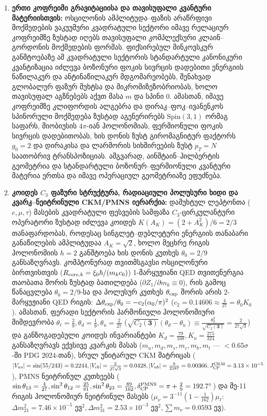 \documentclass[11pt,a4paper]{article}
\begin{document}
\begin{enumerate}[label=\arabic*.]
\item \textbf{ერთი კოფრეიმი გრავიტაციისა და თავისუფალი კვანტური მატერიისთვის:} ოსცილონის ამპლიტუდა–ფაზის არაწრფივი მოქმედების ვაკუუმური კვადრატული სექტორი იმავე რელაციურ კოფრეიმზე ზუსტად იღებს თავისუფალი კომპლექსური კლაინ–გორდონის მოქმედების ფორმას. ფიქსირებულ მინკოვსკურ განშტოებაზე ამ კვადრატული სექტორის სტანდარტული კანონიკური კვანტიზაცია იძლევა ბოზონური ფოკის სივრცის დადებითი ენერგიის ნაწილაკურ და ანტინაწილაკურ მდგომარეობებს, შენახვად გლობალურ ფაზურ მუხტსა და მიკრომიზეზობრიობას, ხოლო თავისუფალ აგზნებებს აქვთ მასა $m$ და სპინი $0$. ამასთან, იმავე კოფრეიმზე კლიფორდის ალგებრა და დირაკ–ფოკ–ივანენკოს სპინორული მოქმედება ზუსტად აგენერირებს $\mathrm{Spin}(3,1)$ ორმაგ საფარს, მიობიუსის $4\pi$-იან ჰოლონომიას, ფერმიონული ფოკის სივრცის დადებითობას, ხის დონის ზუსტ გირომაგნიტურ ფაქტორს $g_0=2$ და დირაკისა და ლარმორის სიხშირეების ზუსტ $p_T = N$ საათობრივ ტრანსპოზიციას. ამგვარად, აინშტაინ–ჰილბერტის გეომეტრია და სტანდარტული ბოზონურ–ფერმიონული კვანტური მატერია ერთსა და იმავე ოპერაციულ გეომეტრიაზე ეფუძნება.
\item \textbf{კოიდეს $C_3$ ფაზური სტრუქტურა, რადიაციული პოლუსური ხიდი და კვარკ–ნეიტრინული CKM/PMNS იერარქია:} დამუხტულ ლეპტონთა ($e,\mu,\tau$) მასების კვადრატული ფესვების სამფაზა $C_3$-ცირკულანტური ოპერატორი ზუსტად იძლევა კოიდეს $K(A_K) = (2+A_K^2)/6 = 2/3$ თანაფარდობას, როდესაც სინგლეტ–დუბლეტური ენერგიის თანაბარი განაწილების ამპლიტუდაა $A_K=\sqrt2$, ხოლო მეცხრე რიგის ჰოლონომიის $h=2$ განშტოება ხის დონის კუთხეს $\theta_0=2/9$ განსაზღვრავს. კომპტონურად თვითმსგავსი ოსცილონური ბირთვისთვის ($R_{{\rm core},k} = \xi_0\hbar/(m_k c_0)$) 1-მარყუჟიანი QED თვითენერგია თაობათა შორის ზუსტად ბათილდება ($\partial Z_1/\partial m_k \equiv 0$), რის გამოც წანაცვლება $\theta_0 = 2/9$-სა და პოლუსურ კუთხეს $\theta_{\rm exp}$ შორის არის 2-მარყუჟიანი QED რიგის: $\Delta\theta_{\rm exp}/\theta_0 = -c_2(\alpha_0/\pi)^2$ ($c_2 = 0.14606 \approx \frac{4}{27} = \theta_0 K_0$). ამასთან, ფერადი სექტორის ჰარმონიული ჰოლონომიური მიმდევრობა $\theta_\ell = \frac{2}{9}, \theta_d = \frac{1}{9}, \theta_u = \frac{2}{27}$ ($\sqrt{C_2(\mathbf{3})}(\theta_d - \theta_u) \equiv \frac{\theta_0^2}{\sqrt{C_2(\mathbf{3})}} = \frac{2}{27\sqrt{3}}$) და განზოგადებული კოიდეს ინვარიანტები $K_d = \frac{79}{108}, K_u = \frac{275}{324}$ განსაზღვრავს ექვსივე კვარკის მასას ($m_u, m_d, m_s, m_c, m_b, m_t$ — $<0.65\sigma$-ში PDG 2024-თან), სრულ უნიტარულ CKM მატრიცას ($|V_{us}| = \sin(55/243) = 0.2244, |V_{cb}| = \frac{2}{27\sqrt{3}} = 0.0428, |V_{ub}| = \frac{8}{2187} = 0.00366, J_{\rm CP}^{\rm CKM} = 3.13\times 10^{-5}$), PMNS ნეიტრინულ კუთხეებს ($\sin\theta_{13} = \frac{4}{27}, \sin^2\theta_{12} = \frac{25}{81}, \sin^2\theta_{23} = \frac{89}{162}, \delta_{\rm CP}^{\rm PMNS} = \pi + \frac{2}{9} = 192.7^\circ$) და მე-11 რიგის ჰოლონომიურ ნეიტრინულ მასებს ($\mu_\nu = 3^{-11}(1-\frac{1}{162})\mu_\ell$: $\Delta m_{21}^2 = 7.46\times 10^{-5}\text{ ევ}^2, \Delta m_{31}^2 = 2.53\times 10^{-3}\text{ ევ}^2, \sum m_\nu = 0.0593\text{ ევ}$).

\end{enumerate}
\end{document}
